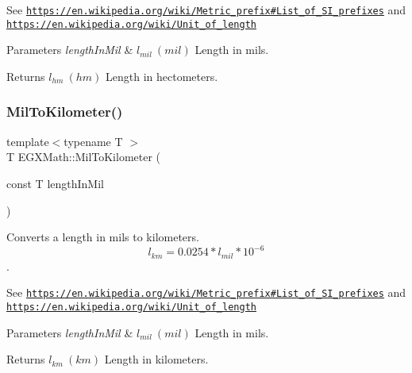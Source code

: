 See \href{https://en.wikipedia.org/wiki/Metric_prefix#List_of_SI_prefixes}{\tt https\+://en.\+wikipedia.\+org/wiki/\+Metric\+\_\+prefix\#\+List\+\_\+of\+\_\+\+S\+I\+\_\+prefixes} and \href{https://en.wikipedia.org/wiki/Unit_of_length}{\tt https\+://en.\+wikipedia.\+org/wiki/\+Unit\+\_\+of\+\_\+length} 
\begin{DoxyParams}{Parameters}
{\em length\+In\+Mil} & $ l_{mil}\ (mil)$ Length in mils. \\
\hline
\end{DoxyParams}
\begin{DoxyReturn}{Returns}
$ l_{hm}\ (hm)$ Length in hectometers. 
\end{DoxyReturn}
\mbox{\label{group___e_g_x_math-_conversions-_length_conversions-_imperial-_mil-_s_i_gac5c7770c3ef34ea18bb8ff86c7093621}} 
\subsubsection{\texorpdfstring{Mil\+To\+Kilometer()}{MilToKilometer()}}
{\footnotesize\ttfamily template$<$typename T $>$ \\
T E\+G\+X\+Math\+::\+Mil\+To\+Kilometer (\begin{DoxyParamCaption}\item[{const T}]{length\+In\+Mil }\end{DoxyParamCaption})}



Converts a length in mils to kilometers. \[ l_{km}=0.0254 * l_{mil} * 10^{-6}\]. 

See \href{https://en.wikipedia.org/wiki/Metric_prefix#List_of_SI_prefixes}{\tt https\+://en.\+wikipedia.\+org/wiki/\+Metric\+\_\+prefix\#\+List\+\_\+of\+\_\+\+S\+I\+\_\+prefixes} and \href{https://en.wikipedia.org/wiki/Unit_of_length}{\tt https\+://en.\+wikipedia.\+org/wiki/\+Unit\+\_\+of\+\_\+length} 
\begin{DoxyParams}{Parameters}
{\em length\+In\+Mil} & $ l_{mil}\ (mil)$ Length in mils. \\
\hline
\end{DoxyParams}
\begin{DoxyReturn}{Returns}
$ l_{km}\ (km)$ Length in kilometers. 
\end{DoxyReturn}
\mbox{\label{group___e_g_x_math-_conversions-_length_conversions-_imperial-_mil-_s_i_gae228b3057d3b2341ab55f72895588b5e}} 
